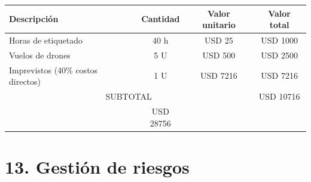 \documentclass[
11pt, %
]{charter}
\begin{document}
\begin{table}[htpb]
\begin{tabularx}{\linewidth}{@{}|X|c|r|r|@{}}
    \rowcolor[HTML]{C0C0C0} Descripción                         &
    \multicolumn{1}{c|}{\cellcolor[HTML]{C0C0C0}Cantidad}       &
    \multicolumn{1}{c|}{\cellcolor[HTML]{C0C0C0}Valor unitario} &
    \multicolumn{1}{c|}{\cellcolor[HTML]{C0C0C0}Valor total}        \\ \hline

    Horas de etiquetado                                         &
    \multicolumn{1}{c|}{40 h}                                   &
    \multicolumn{1}{c|}{USD 25}                                 &
    \multicolumn{1}{c|}{USD 1000}                                   \\ \hline

    Vuelos de drones                                            &
    \multicolumn{1}{c|}{5 U}                                    &
    \multicolumn{1}{c|}{USD 500}                                &
    \multicolumn{1}{c|}{USD 2500}                                   \\ \hline

    Imprevistos (40\% costos directos)                          &
    \multicolumn{1}{c|}{1 U}                                    &
    \multicolumn{1}{c|}{USD 7216}                               &
    \multicolumn{1}{c|}{USD 7216}                                   \\ \hline

    \multicolumn{3}{|c|}{SUBTOTAL}                              &
    \multicolumn{1}{c|}{USD 10716}                                  \\ \hline
    \rowcolor[HTML]{C0C0C0}
    \multicolumn{3}{|c|}{TOTAL}                                 &

    USD 28756                                                       \\ \hline
  \end{tabularx}%
\end{table}


\section{13. Gestión de riesgos}
\label{sec:riesgos}
\end{document}
